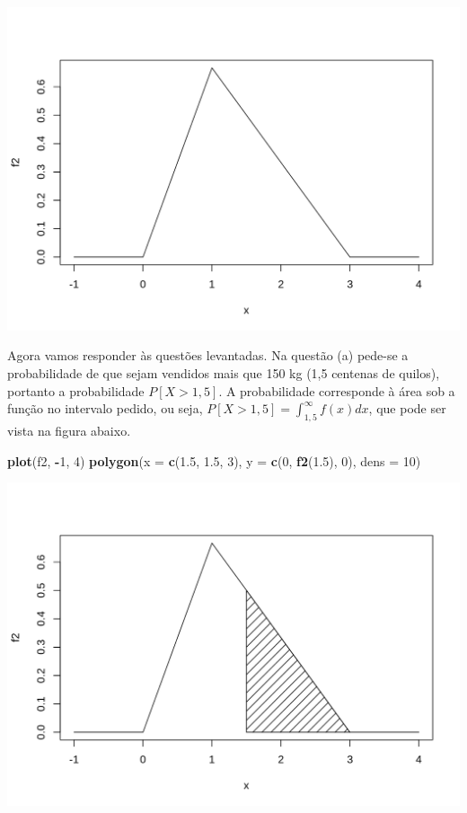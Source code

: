 \documentclass[10pt,a4paper]{book}
\newenvironment{Shaded}{\begin{snugshade}}{\end{snugshade}}
\newcommand{\KeywordTok}[1]{\textcolor[rgb]{0.13,0.29,0.53}{\textbf{#1}}}
\newcommand{\DataTypeTok}[1]{\textcolor[rgb]{0.13,0.29,0.53}{#1}}
\newcommand{\DecValTok}[1]{\textcolor[rgb]{0.00,0.00,0.81}{#1}}
\newcommand{\FloatTok}[1]{\textcolor[rgb]{0.00,0.00,0.81}{#1}}
\newcommand{\OperatorTok}[1]{\textcolor[rgb]{0.81,0.36,0.00}{\textbf{#1}}}
\newcommand{\NormalTok}[1]{#1}
\begin{document}
\begin{center}\includegraphics{figures/unnamed-chunk-332-1} \end{center}

Agora vamos responder às questões levantadas. Na questão (a) pede-se a
probabilidade de que sejam vendidos mais que 150 kg (1,5 centenas de
quilos), portanto a probabilidade \(P[X > 1,5]\). A probabilidade
corresponde à área sob a função no intervalo pedido, ou seja,
\(P[X > 1,5] = \int_{1,5}^\infty f(x) dx\), que pode ser vista na figura
abaixo.

\begin{Shaded}
\begin{Highlighting}[]
\KeywordTok{plot}\NormalTok{(f2, }\OperatorTok{-}\DecValTok{1}\NormalTok{, }\DecValTok{4}\NormalTok{)}
\KeywordTok{polygon}\NormalTok{(}\DataTypeTok{x =} \KeywordTok{c}\NormalTok{(}\FloatTok{1.5}\NormalTok{, }\FloatTok{1.5}\NormalTok{, }\DecValTok{3}\NormalTok{), }\DataTypeTok{y =} \KeywordTok{c}\NormalTok{(}\DecValTok{0}\NormalTok{, }\KeywordTok{f2}\NormalTok{(}\FloatTok{1.5}\NormalTok{), }\DecValTok{0}\NormalTok{), }\DataTypeTok{dens =} \DecValTok{10}\NormalTok{)}
\end{Highlighting}
\end{Shaded}

\begin{center}\includegraphics{figures/unnamed-chunk-333-1} \end{center}
\end{document}
